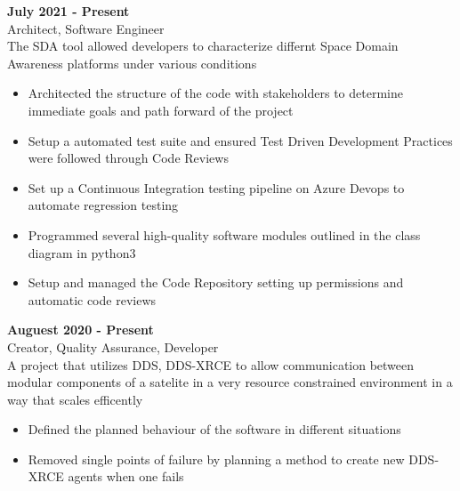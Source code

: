 {    \noindent\begin{minipage}{\linewidth}
 \hfill \textbf{July 2021 - Present}\\
Architect, Software Engineer\hfill \\The SDA tool allowed developers to characterize differnt Space Domain Awareness platforms under various conditions
\begin{itemize}[noitemsep,nolistsep]
\item Architected the structure of the code with stakeholders to determine immediate goals and path forward of the project
\item Setup a automated test suite and ensured Test Driven Development Practices were followed through Code Reviews
\item Set up a Continuous Integration testing pipeline on Azure Devops to automate regression testing
\item Programmed several high-quality software modules outlined in the class diagram in python3
\item Setup and managed the Code Repository setting up permissions and automatic code reviews
\end{itemize}


\end{minipage}
\vspace{\entrySpacing}

    \noindent\begin{minipage}{\linewidth}
 \hfill \textbf{Auguest 2020 - Present}\\
Creator, Quality Assurance, Developer\hfill \\A project that utilizes DDS, DDS-XRCE to allow communication between modular components of a satelite in a very resource constrained environment in a way that scales efficently
\begin{itemize}[noitemsep,nolistsep]
\item Defined the planned behaviour of the software in different situations
\item Removed single points of failure by planning a method to create new DDS-XRCE agents when one fails
\end{itemize}


\end{minipage}
\vspace{\entrySpacing}

  }

